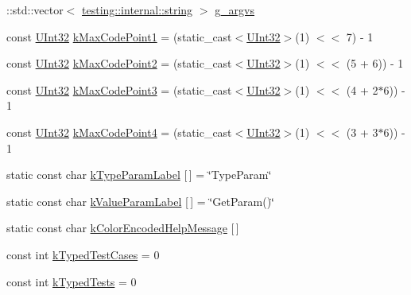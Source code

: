 \begin{DoxyCompactItemize}
\item 
\+::std\+::vector$<$ \hyperlink{namespacetesting_1_1internal_a8e8ff5b11e64078831112677156cb111}{testing\+::internal\+::string} $>$ \hyperlink{namespacetesting_1_1internal_ab7fe90df4f87f1bd8a244b0be2ccad79}{g\+\_\+argvs}
\item 
const \hyperlink{namespacetesting_1_1internal_a40d4fffcd2bf56f18b1c380615aa85e3}{U\+Int32} \hyperlink{namespacetesting_1_1internal_a128515c8ed6c0fe98e498c8042da2060}{k\+Max\+Code\+Point1} = (static\+\_\+cast$<$\hyperlink{namespacetesting_1_1internal_a40d4fffcd2bf56f18b1c380615aa85e3}{U\+Int32}$>$(1) $<$$<$ 7) -\/ 1
\item 
const \hyperlink{namespacetesting_1_1internal_a40d4fffcd2bf56f18b1c380615aa85e3}{U\+Int32} \hyperlink{namespacetesting_1_1internal_ab8f4a5ed784352f00342cfeadc72337e}{k\+Max\+Code\+Point2} = (static\+\_\+cast$<$\hyperlink{namespacetesting_1_1internal_a40d4fffcd2bf56f18b1c380615aa85e3}{U\+Int32}$>$(1) $<$$<$ (5 + 6)) -\/ 1
\item 
const \hyperlink{namespacetesting_1_1internal_a40d4fffcd2bf56f18b1c380615aa85e3}{U\+Int32} \hyperlink{namespacetesting_1_1internal_aa42bd507418e570402996e33582beed3}{k\+Max\+Code\+Point3} = (static\+\_\+cast$<$\hyperlink{namespacetesting_1_1internal_a40d4fffcd2bf56f18b1c380615aa85e3}{U\+Int32}$>$(1) $<$$<$ (4 + 2$\ast$6)) -\/ 1
\item 
const \hyperlink{namespacetesting_1_1internal_a40d4fffcd2bf56f18b1c380615aa85e3}{U\+Int32} \hyperlink{namespacetesting_1_1internal_acd87c60be9b5fedb2d017503d8834474}{k\+Max\+Code\+Point4} = (static\+\_\+cast$<$\hyperlink{namespacetesting_1_1internal_a40d4fffcd2bf56f18b1c380615aa85e3}{U\+Int32}$>$(1) $<$$<$ (3 + 3$\ast$6)) -\/ 1
\item 
static const char \hyperlink{namespacetesting_1_1internal_ae6e5e31b85dac8586d4cc1ab1671f438}{k\+Type\+Param\+Label} \mbox{[}$\,$\mbox{]} = \char`\"{}Type\+Param\char`\"{}
\item 
static const char \hyperlink{namespacetesting_1_1internal_ae57eee0bf5371ff8e9688fb4464bc62b}{k\+Value\+Param\+Label} \mbox{[}$\,$\mbox{]} = \char`\"{}Get\+Param()\char`\"{}
\item 
static const char \hyperlink{namespacetesting_1_1internal_a159395e649dd7728b09b25f70847f1ca}{k\+Color\+Encoded\+Help\+Message} \mbox{[}$\,$\mbox{]}
\item 
const int \hyperlink{namespacetesting_1_1internal_a685ea5332074ae63b0ded2b184ac2271}{k\+Typed\+Test\+Cases} = 0
\item 
const int \hyperlink{namespacetesting_1_1internal_a53ee2d113744f9ba1d89469db4d7388b}{k\+Typed\+Tests} = 0
\end{DoxyCompactItemize}


